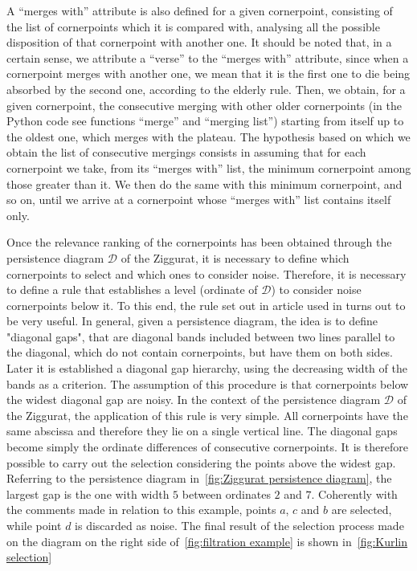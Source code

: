\documentclass[english, LaM, oneside, noexaminfo]{sapthesis}
\begin{document}
A ``merges with'' attribute is also defined for a given cornerpoint, consisting of the list of cornerpoints which it is compared with, analysing all the possible disposition of that cornerpoint with another one.
It should be noted that, in a certain sense, we attribute a ``verse'' to the ``merges with'' attribute, since when a cornerpoint merges with another one, we mean that it is the first one to die being absorbed by the second one, according to the elderly rule.
Then, we obtain, for a given cornerpoint, the consecutive merging with other older cornerpoints (in the Python code see functions ``merge'' and ``merging list'') starting from itself up to the oldest one, which merges with the plateau. The hypothesis based on which we obtain the list of consecutive mergings consists in assuming that for each cornerpoint we take, from its ``merges with'' list, the minimum cornerpoint among those greater than it. We then do the same with this minimum cornerpoint, and so on, until we arrive at a cornerpoint whose ``merges with'' list contains itself only.

Once the relevance ranking of the cornerpoints has been obtained through the persistence diagram $\mathcal{D}$ of the Ziggurat, it is necessary to define which cornerpoints to select
and which ones to consider  noise. Therefore, it is necessary to define a rule that establishes a level (ordinate of $\mathcal{D}$)  to consider noise cornerpoints below it. To this end, the rule set out in article \cite{kurlin2016fast} used in \cite{bergomi2020steady} turns out to be very useful.  In general, given a persistence diagram, the idea is to define "diagonal gaps", that are diagonal bands
included between two lines parallel to the diagonal, which do not contain cornerpoints, but have them on both sides. Later it is established a diagonal gap hierarchy, using the decreasing width of the bands as a criterion.
The assumption of this procedure is that cornerpoints below the widest diagonal gap are noisy.
In the context of the persistence diagram $\mathcal{D}$ of the Ziggurat, the application
of this rule is very simple. All cornerpoints have the same
abscissa and therefore they lie on a single vertical line. The diagonal gaps become simply the ordinate differences of consecutive cornerpoints. It is therefore possible to carry out
the selection considering the points above the widest gap.
Referring to the persistence diagram in~\cref{fig:Ziggurat persistence diagram}, the largest gap
is the one with width $5$ between ordinates $2$ and $7$. Coherently with the comments made in relation to this example, points $a$, $c$ and $b$ are selected, while point $d$ is discarded as noise. The final result of the selection process made on the diagram on the right side of~\cref{fig:filtration example} is shown in~\cref{fig:Kurlin selection}
\end{document}
